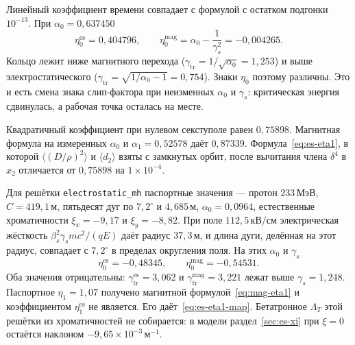 Линейный коэффициент времени совпадает с формулой с остатком подгонки $10^{-13}$. При $\alpha_0=0{,}637450$
\begin{equation}
\label{eq:es-num-eta0}
\eta_0^{\mathrm{es}}=0{,}404796,
\qquad
\eta_0^{\mathrm{mag}}=\alpha_0-\frac{1}{\gamma_s^2}=-0{,}004265.
\end{equation}
Кольцо лежит ниже магнитного перехода ($\gamma_{\mathrm{tr}}=1/\sqrt{\alpha_0}=1{,}253$) и выше электростатического ($\gamma_{\mathrm{tr}}=\sqrt{1/\alpha_0-1}=0{,}754$). Знаки $\eta_0$ поэтому различны. Это и есть смена знака слип-фактора при неизменных $\alpha_0$ и $\gamma_s$: критическая энергия сдвинулась, а рабочая точка осталась на месте.

Квадратичный коэффициент при нулевом секступоле равен $0{,}75898$. Магнитная формула на измеренных $\alpha_0$ и $\alpha_1=0{,}52578$ даёт $0{,}87339$. Формула~\eqref{eq:es-eta1}, в которой $\langle(D/\rho)^2\rangle$ и $\langle d_2\rangle$ взяты с замкнутых орбит, после вычитания члена $\delta^4$ в $x_2$ отличается от $0{,}75898$ на $1\times 10^{-4}$.

Для решётки \texttt{electrostatic\_mh} паспортные значения --- протон $233\,\mathrm{МэВ}$, $C=419{,}1\,\mathrm{м}$, пятьдесят дуг по $7{,}2^\circ$ и $4{,}685\,\mathrm{м}$, $\alpha_0=0{,}0964$, естественные хроматичности $\xi_x=-9{,}17$ и $\xi_y=-8{,}82$. При поле $112{,}5\,\mathrm{кВ/см}$ электрическая жёсткость $\beta_s^2\gamma_s mc^2/(qE)$ даёт радиус $37{,}3\,\mathrm{м}$, и длина дуги, делённая на этот радиус, совпадает с $7{,}2^\circ$ в пределах округления поля. На этих $\alpha_0$ и $\gamma_s$
\begin{equation}
\label{eq:es-mh}
\eta_0^{\mathrm{es}}=-0{,}48345,
\qquad
\eta_0^{\mathrm{mag}}=-0{,}54531.
\end{equation}
Оба значения отрицательны: $\gamma_{\mathrm{tr}}^{\mathrm{es}}=3{,}062$ и $\gamma_{\mathrm{tr}}^{\mathrm{mag}}=3{,}221$ лежат выше $\gamma_s=1{,}248$. Паспортное $\eta_1=1{,}07$ получено магнитной формулой~\eqref{eq:mag-eta1} и коэффициентом $\eta_1^{\mathrm{es}}$ не является. Его даёт~\eqref{eq:es-eta1-map}. Бетатронное $\Lambda_T$ этой решётки из хроматичностей не собирается: в модели раздел~\ref{sec:es-xi} при $\xi=0$ остаётся наклоном $-9{,}65\times 10^{-3}\,\mathrm{м}^{-1}$.
